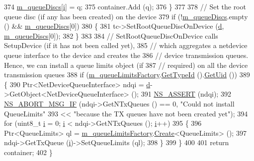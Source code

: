 \begin{DoxyCode}
374       \hyperlink{classns3_1_1TrafficControlHelper_a0eb99bd58e5d9858d7eb5b4453f886b1}{m\_queueDiscs}[\hyperlink{bernuolliDistribution_8m_a6f6ccfcf58b31cb6412107d9d5281426}{i}] = q;
375       container.Add (q);
376     \}
377 
378   \textcolor{comment}{// Set the root queue disc (if any has been created) on the device}
379   \textcolor{keywordflow}{if} (!\hyperlink{classns3_1_1TrafficControlHelper_a0eb99bd58e5d9858d7eb5b4453f886b1}{m\_queueDiscs}.empty () && \hyperlink{classns3_1_1TrafficControlHelper_a0eb99bd58e5d9858d7eb5b4453f886b1}{m\_queueDiscs}[0])
380     \{
381       tc->SetRootQueueDiscOnDevice (\hyperlink{buildings__pathloss_8m_a9f9b934daed17a4d3613b6886ff4cf4b}{d}, \hyperlink{classns3_1_1TrafficControlHelper_a0eb99bd58e5d9858d7eb5b4453f886b1}{m\_queueDiscs}[0]);
382     \}
383 
384   \textcolor{comment}{// SetRootQueueDiscOnDevice calls SetupDevice (if it has not been called yet),}
385   \textcolor{comment}{// which aggregates a netdevice queue interface to the device and creates the}
386   \textcolor{comment}{// device transmission queues. Hence, we can install a queue limits object (if}
387   \textcolor{comment}{// required) on all the device transmission queues}
388   \textcolor{keywordflow}{if} (\hyperlink{classns3_1_1TrafficControlHelper_a7f9b244a4dc4e88326850501d56bffa4}{m\_queueLimitsFactory}.\hyperlink{classns3_1_1ObjectFactory_a14baab41e2bd984a3eee543b8d8086d7}{GetTypeId} ().\hyperlink{classns3_1_1TypeId_acd3e41de6340d06299f4fd63e2ed8da0}{GetUid} ())
389     \{
390       Ptr<NetDeviceQueueInterface> ndqi = \hyperlink{buildings__pathloss_8m_a9f9b934daed17a4d3613b6886ff4cf4b}{d}->GetObject<NetDeviceQueueInterface> ();
391       \hyperlink{assert_8h_a6dccdb0de9b252f60088ce281c49d052}{NS\_ASSERT} (ndqi);
392       \hyperlink{group__fatal_ga6653324225bc139e46deea177614ceee}{NS\_ABORT\_MSG\_IF} (ndqi->GetNTxQueues () == 0, \textcolor{stringliteral}{"Could not install QueueLimits"}
393                        << \textcolor{stringliteral}{"because the TX queues have not been created yet"});
394       \textcolor{keywordflow}{for} (uint8\_t \hyperlink{bernuolliDistribution_8m_a6f6ccfcf58b31cb6412107d9d5281426}{i} = 0; \hyperlink{bernuolliDistribution_8m_a6f6ccfcf58b31cb6412107d9d5281426}{i} < ndqi->GetNTxQueues (); \hyperlink{bernuolliDistribution_8m_a6f6ccfcf58b31cb6412107d9d5281426}{i}++)
395         \{
396           Ptr<QueueLimits> ql = \hyperlink{classns3_1_1TrafficControlHelper_a7f9b244a4dc4e88326850501d56bffa4}{m\_queueLimitsFactory}.\hyperlink{classns3_1_1ObjectFactory_a18152e93f0a6fe184ed7300cb31e9896}{Create}<QueueLimits> ();
397           ndqi->GetTxQueue (\hyperlink{bernuolliDistribution_8m_a6f6ccfcf58b31cb6412107d9d5281426}{i})->SetQueueLimits (ql);
398         \}
399     \}
400 
401   \textcolor{keywordflow}{return} container;
402 \}
\end{DoxyCode}


